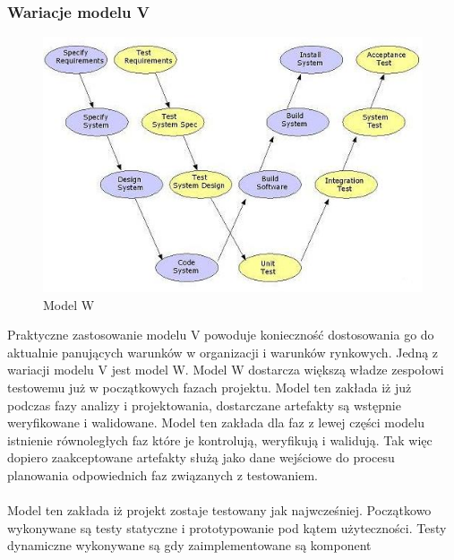 \subsubsection{Wariacje modelu V}
\begin{figure}[h]
\centerline{\includegraphics[scale=0.5]{img/Wmodel3.JPG}}
\caption{Model W}
\label{fig:wmodel}
\end{figure}

Praktyczne zastosowanie modelu V powoduje konieczność dostosowania go do aktualnie panujących warunków w organizacji i warunków rynkowych. Jedną z wariacji modelu V jest model W. Model W dostarcza większą władze zespołowi testowemu już w początkowych fazach projektu. Model ten zakłada iż już podczas fazy analizy i projektowania, dostarczane artefakty są wstępnie weryfikowane i walidowane. Model ten zakłada dla faz z lewej części modelu istnienie równoległych faz które je kontrolują, weryfikują i walidują. Tak więc dopiero zaakceptowane artefakty służą jako dane wejściowe do procesu planowania odpowiednich faz związanych z testowaniem.
\paragraph{}
Model ten zakłada iż projekt zostaje testowany jak najwcześniej. Początkowo wykonywane są testy statyczne i prototypowanie pod kątem użyteczności. Testy dynamiczne wykonywane są gdy zaimplementowane są komponent


